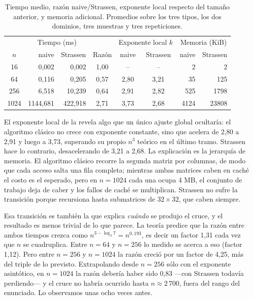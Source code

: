 \begin{table}[H]
  \centering
  \begin{tabular}{crrcccrr}
  \hline
  & \multicolumn{2}{c}{Tiempo (ms)} & &
    \multicolumn{2}{c}{Exponente local $k$} &
    \multicolumn{2}{c}{Memoria (KiB)} \\
  $n$ & naive & Strassen & Razón & naive & Strassen & naive & Strassen \\
  \hline
  16   &    0,002 &   0,002 & 1,00 & --   & --   &    2 &     2 \\
  64   &    0,116 &   0,205 & 0,57 & 2,80 & 3,21 &   35 &   125 \\
  256  &    6,518 &  10,239 & 0,64 & 2,91 & 2,82 &  525 &  1798 \\
  1024 & 1144,681 & 422,918 & 2,71 & 3,73 & 2,68 & 4124 & 23808 \\
  \hline
  \end{tabular}
  \caption{Tiempo medio, razón naive/Strassen, exponente local respecto del
  tamaño anterior, y memoria adicional. Promedios sobre los tres tipos, los dos
  dominios, tres muestras y tres repeticiones.}
  \label{tab:matriz}
\end{table}

El exponente local de la  revela algo que un único ajuste
global ocultaría: el algoritmo clásico no crece con exponente constante, sino
que acelera de 2,80 a 2,91 y luego a 3,73, superando su propio $n^3$ teórico en
el último tramo. Strassen hace lo contrario, desacelerando de 3,21 a 2,68. La
explicación es la jerarquía de memoria. El algoritmo clásico recorre la segunda
matriz por columnas, de modo que cada acceso salta una fila completa; mientras
ambas matrices caben en caché el costo es el esperado, pero en $n = 1024$ cada
una ocupa 4 MB, el conjunto de trabajo deja de caber y los fallos de caché se
multiplican. Strassen no sufre la transición porque recursiona hasta submatrices
de $32 \times 32$, que caben siempre.

Esa transición es también la que explica \emph{cuándo} se produjo el cruce, y el
resultado es menos trivial de lo que parece. La teoría predice que la razón entre
ambos tiempos crezca como $n^{3 - \log_2 7} = n^{0{,}193}$, es decir un factor
1,31 cada vez que $n$ se cuadruplica. Entre $n = 64$ y $n = 256$ lo medido se
acerca a eso (factor 1,12). Pero entre $n = 256$ y $n = 1024$ la razón creció por
un factor de 4,25, más del triple de lo previsto. Extrapolando desde $n = 256$
sólo con el exponente asintótico, en $n = 1024$ la razón debería haber sido 0,83
---con Strassen todavía perdiendo--- y el cruce no habría ocurrido hasta
$n \approx 2\,700$, fuera del rango del enunciado. Lo observamos unas ocho veces
antes.


